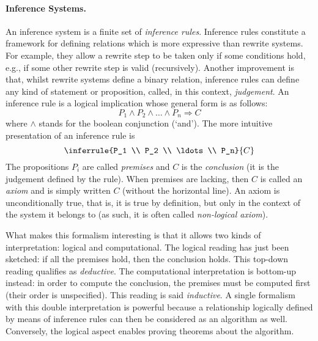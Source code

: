 \paragraph{Inference Systems.}

An inference system is a finite set of \emph{inference
  rules}. Inference rules constitute a framework for defining
relations which is more expressive than rewrite systems. For example,
they allow a rewrite step to be taken only if some conditions hold,
e.g., if some other rewrite step is valid (recursively). Another
improvement is that, whilst rewrite systems define a binary relation,
inference rules can define any kind of statement or proposition,
called, in this context, \emph{judgement}. An inference rule is a
logical implication whose general form is as follows:
\[
P_1 \wedge P_2 \wedge \ldots \wedge P_n \Rightarrow C
\]
where \(\wedge\) stands for the boolean conjunction (`and'). The more
intuitive presentation of an inference rule is
\[
\inferrule
  {P_1 \\ P_2 \\ \ldots \\ P_n}
  {C}
\]
The propositions \(P_i\) are called \emph{premises} and \(C\) is the
\emph{conclusion} (it is the judgement defined by the rule). When
premises are lacking, then \(C\) is called an \emph{axiom} and is
simply written \(C\) (without the horizontal line). An axiom is
unconditionally true, that is, it is true by definition, but only in
the context of the system it belongs to (as such, it is often called
\emph{non\hyp{}logical axiom}).

What makes this formalism interesting is that it allows two kinds of
interpretation: logical and computational. The logical reading has
just been sketched: if all the premises hold, then the conclusion
holds. This top\hyp{}down reading qualifies as \emph{deductive}. The
computational interpretation is bottom\hyp{}up instead: in order to
compute the conclusion, the premises must be computed first (their
order is unspecified). This reading is said \emph{inductive}. A single
formalism with this double interpretation is powerful because a
relationship logically defined by means of inference rules can then be
considered as an algorithm as well. Conversely, the logical aspect
enables proving theorems about the algorithm.

